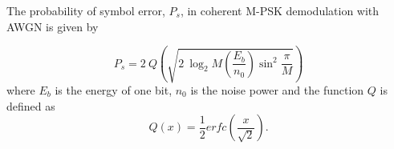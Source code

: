 %
%
%
%
%
%
%
%
%
%
%

The probability of symbol error, $P_s$, in coherent M-PSK demodulation with AWGN is given by

\begin{equation}
	P_s=2~Q\left(\sqrt{2~\log_2 M \left(\frac{E_b}{n_0}\right)\sin^2\frac{\pi}{M}}\right)
\end{equation}
where $E_b$ is the energy of one bit, $n_0$ is the noise power and the function $Q$ is defined as
\begin{equation}
	Q(x)=\frac{1}{2} erfc\left(\frac{x}{\sqrt{2}}\right).
	\label{eq:Ps}
\end{equation}

